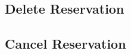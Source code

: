 
\subsection{Delete Reservation}
\label{ch:Process Design:sec:Implemented Use Cases:ssec:Delete Reservation}


\subsection{Cancel Reservation}
\label{ch:Process Design:sec:Implemented Use Cases:ssec:Cancel Reservation}


